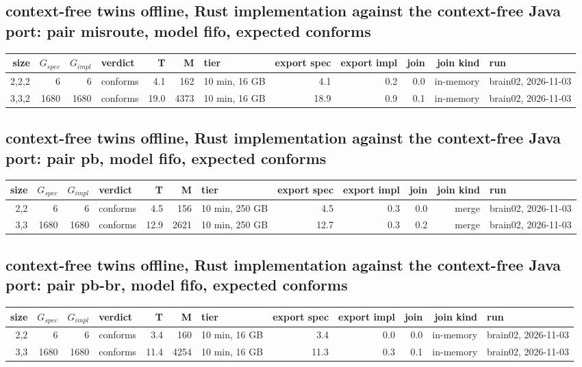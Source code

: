 \documentclass[10pt]{article}
\begin{document}
\subsection*{context-free twins offline, Rust implementation against the context-free Java port: pair \textsf{misroute}, model fifo, expected conforms}
\begin{longtable}{@{}rrrlrrlrrrrl@{}}
\toprule
size & $G_{\mathit{spec}}$ & $G_{\mathit{impl}}$ & verdict & T & M & tier & export spec & export impl & join & join kind & run \\
\midrule
\endhead
\color{red} 2,2,2 & 6 & 6 & conforms & 4.1 & 162 & 10 min, 16 GB & 4.1 & 0.2 & 0.0 & in-memory & brain02, 2026-11-03 \\
\color{red} 3,3,2 & 1680 & 1680 & conforms & 19.0 & 4373 & 10 min, 16 GB & 18.9 & 0.9 & 0.1 & in-memory & brain02, 2026-11-03 \\
\bottomrule
\end{longtable}
\subsection*{context-free twins offline, Rust implementation against the context-free Java port: pair \textsf{pb}, model fifo, expected conforms}
\begin{longtable}{@{}rrrlrrlrrrrl@{}}
\toprule
size & $G_{\mathit{spec}}$ & $G_{\mathit{impl}}$ & verdict & T & M & tier & export spec & export impl & join & join kind & run \\
\midrule
\endhead
\color{blue} 2,2 & 6 & 6 & conforms & 4.5 & 156 & 10 min, 250 GB & 4.5 & 0.3 & 0.0 & merge & brain02, 2026-11-03 \\
\color{blue} 3,3 & 1680 & 1680 & conforms & 12.9 & 2621 & 10 min, 250 GB & 12.7 & 0.3 & 0.2 & merge & brain02, 2026-11-03 \\
\bottomrule
\end{longtable}
\subsection*{context-free twins offline, Rust implementation against the context-free Java port: pair \textsf{pb-br}, model fifo, expected conforms}
\begin{longtable}{@{}rrrlrrlrrrrl@{}}
\toprule
size & $G_{\mathit{spec}}$ & $G_{\mathit{impl}}$ & verdict & T & M & tier & export spec & export impl & join & join kind & run \\
\midrule
\endhead
\color{red} 2,2 & 6 & 6 & conforms & 3.4 & 160 & 10 min, 16 GB & 3.4 & 0.0 & 0.0 & in-memory & brain02, 2026-11-03 \\
\color{red} 3,3 & 1680 & 1680 & conforms & 11.4 & 4254 & 10 min, 16 GB & 11.3 & 0.3 & 0.1 & in-memory & brain02, 2026-11-03 \\
\bottomrule
\end{longtable}
\end{document}
